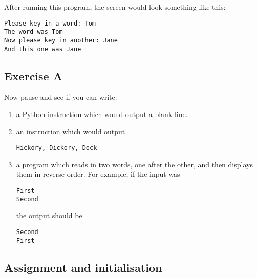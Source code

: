 



After running this program, the screen would look something like this:
\begin{Verbatim}
Please key in a word: Tom
The word was Tom
Now please key in another: Jane
And this one was Jane
\end{Verbatim}


\subsection*{Exercise A}

Now pause and see if you can write:
\begin{enumerate}
\item
a Python instruction which would output a blank line.
\item
an instruction which would output

\begin{Verbatim}
Hickory, Dickory, Dock
\end{Verbatim}

\item
a program which reads in two words, one after the other, and then displays them
in reverse order. For example, if the input was 

\begin{Verbatim}
First
Second
\end{Verbatim}

the output should be

\begin{Verbatim}
Second
First
\end{Verbatim}

\end{enumerate}


\subsection{Assignment and initialisation}

